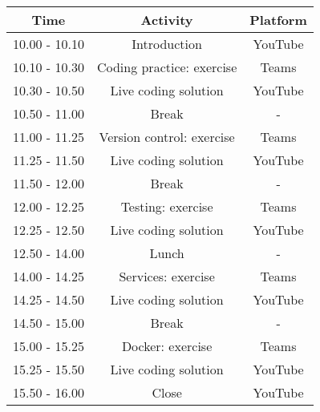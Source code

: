 
    
    \begin{tabular}{c|c|c}

         \textbf{Time} & \textbf{Activity} & \textbf{Platform}  \\

         \hline

         10.00 - 10.10 & Introduction & YouTube \\

         \hline

         10.10 - 10.30 & Coding practice: exercise & Teams \\

         \hline

         10.30 - 10.50 & Live coding solution & YouTube \\

         \hline

         10.50 - 11.00 & Break & - \\

         \hline

         11.00 - 11.25 & Version control: exercise & Teams \\

         \hline

         11.25 - 11.50 & Live coding solution & YouTube \\

         \hline

         11.50 - 12.00 & Break & - \\

         \hline

         12.00 - 12.25 & Testing: exercise & Teams \\

         \hline

         12.25 - 12.50 & Live coding solution & YouTube \\

         \hline

         12.50 - 14.00 & Lunch & - \\

         \hline

         14.00 - 14.25 & Services: exercise & Teams \\

         \hline

         14.25 - 14.50 & Live coding solution & YouTube \\

         \hline

         14.50 - 15.00 & Break & - \\

         \hline

         15.00 - 15.25 & Docker: exercise & Teams \\

         \hline

         15.25 - 15.50 & Live coding solution & YouTube \\

         \hline

         15.50 - 16.00 & Close & YouTube \\

         \hline

    \end{tabular}